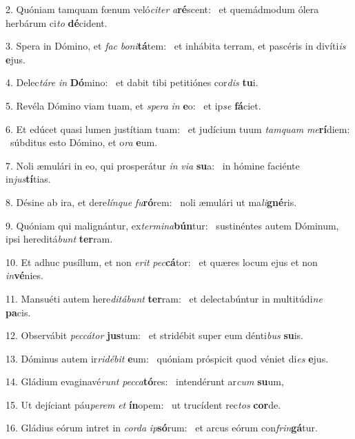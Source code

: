 2. Quóniam tamquam fœnum veló\textit{ci}\textit{ter} \textit{a}\textbf{ré}scent: \ast\  et quemádmodum ólera herbárum ci\textit{to} \textbf{dé}cident.\

3. Spera in Dómino, et \textit{fac} \textit{bo}\textit{ni}\textbf{tá}tem: \ast\  et inhábita terram, et pascéris in divíti\textit{is} \textbf{e}jus.\

4. Delec\textit{tá}\textit{re} \textit{in} \textbf{Dó}mino: \ast\  et dabit tibi petitiónes cor\textit{dis} \textbf{tu}i.\

5. Revéla Dómino viam tuam, et \textit{spe}\textit{ra} \textit{in} \textbf{e}o: \ast\  et ip\textit{se} \textbf{fá}ciet.\

6. Et edúcet quasi lumen justítiam tuam: \dag\  et judícium tuum \textit{tam}\textit{quam} \textit{me}\textbf{rí}diem: \ast\  súbditus esto Dómino, et o\textit{ra} \textbf{e}um.\

7. Noli æmulári in eo, qui prosperátur \textit{in} \textit{vi}\textit{a} \textbf{su}a: \ast\  in hómine faciénte in\textit{jus}\textbf{tí}tias.\

8. Désine ab ira, et dere\textit{lín}\textit{que} \textit{fu}\textbf{ró}rem: \ast\  noli æmulári ut ma\textit{li}\textbf{gné}ris.\

9. Quóniam qui malignántur, ex\textit{ter}\textit{mi}\textit{na}\textbf{bún}tur: \ast\  sustinéntes autem Dóminum, ipsi hereditá\textit{bunt} \textbf{ter}ram.\

10. Et adhuc pusíllum, et non \textit{e}\textit{rit} \textit{pec}\textbf{cá}tor: \ast\  et quæres locum ejus et non \textit{in}\textbf{vé}nies.\

11. Mansuéti autem here\textit{di}\textit{tá}\textit{bunt} \textbf{ter}ram: \ast\  et delectabúntur in multitúdi\textit{ne} \textbf{pa}cis.\

12. Observábit \textit{pec}\textit{cá}\textit{tor} \textbf{jus}tum: \ast\  et stridébit super eum dénti\textit{bus} \textbf{su}is.\

13. Dóminus autem ir\textit{ri}\textit{dé}\textit{bit} \textbf{e}um: \ast\  quóniam próspicit quod véniet di\textit{es} \textbf{e}jus.\

14. Gládium evaginavé\textit{runt} \textit{pec}\textit{ca}\textbf{tó}res: \ast\  intendérunt ar\textit{cum} \textbf{su}um,\

15. Ut dejíciant páu\textit{pe}\textit{rem} \textit{et} \textbf{ín}opem: \ast\  ut trucídent rec\textit{tos} \textbf{cor}de.\

16. Gládius eórum intret in \textit{cor}\textit{da} \textit{ip}\textbf{só}rum: \ast\  et arcus eórum con\textit{frin}\textbf{gá}tur.\

